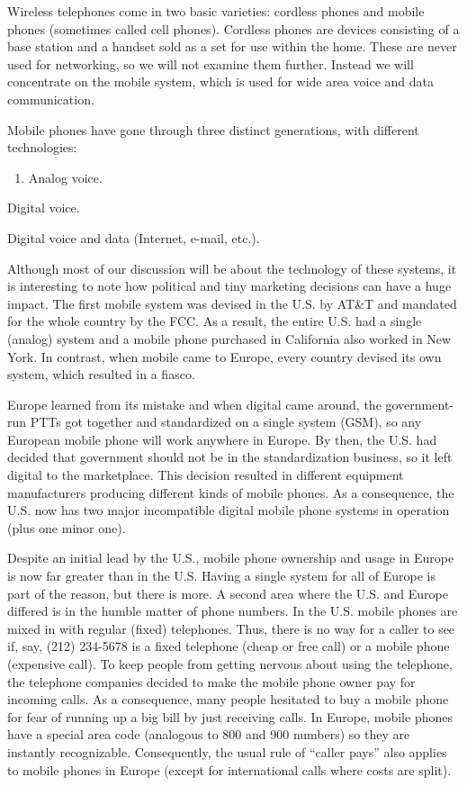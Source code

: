 Wireless telephones come in two basic varieties: cordless phones and
mobile phones (sometimes called {cell phones}). {Cordless phones} are
devices consisting of a base station and a handset sold as a set for use
within the home. These are never used for networking, so we will not
examine them further. Instead we will concentrate on the mobile system,
which is used for wide area voice and data communication.

{Mobile phones} have gone through three distinct generations, with
different technologies:

\begin{enumerate}
\def\labelenumi{\arabic{enumi}.}
\item
  {}

  Analog voice.
\end{enumerate}

Digital voice.

Digital voice and data (Internet, e-mail, etc.).

Although most of our discussion will be about the technology of these
systems, it is interesting to note how political and tiny marketing
decisions can have a huge impact. The first mobile system was devised in
the U.S. by AT\&T and mandated for the whole country by the FCC. As a
result, the entire U.S. had a single (analog) system and a mobile phone
purchased in California also worked in New York. In contrast, when
mobile came to Europe, every country devised its own system, which
resulted in a fiasco.

Europe learned from its mistake and when digital came around, the
government-run PTTs got together and standardized on a single system
(GSM), so any European mobile phone will work anywhere in Europe. By
then, the U.S. had decided that government should not be in the
standardization business, so it left digital to the marketplace. This
decision resulted in different equipment manufacturers producing
different kinds of mobile phones. As a consequence, the U.S. now has two
major incompatible digital mobile phone systems in operation (plus one
minor one).

Despite an initial lead by the U.S., mobile phone ownership and usage in
Europe is now far greater than in the U.S. Having a single system for
all of Europe is part of the reason, but there is more. A second area
where the U.S. and Europe differed is in the humble matter of phone
numbers. In the U.S. mobile phones are mixed in with regular (fixed)
telephones. Thus, there is no way for a caller to see if, say, (212)
234-5678 is a fixed telephone (cheap or free call) or a mobile phone
(expensive call). To keep people from getting nervous about using the
telephone, the telephone companies decided to make the mobile phone
owner pay for incoming calls. As a consequence, many people hesitated to
buy a mobile phone for fear of running up a big bill by just receiving
calls. In Europe, mobile phones have a special area code (analogous to
800 and 900 numbers) so they are instantly recognizable. Consequently,
the usual rule of ``caller pays'' also applies to mobile phones in
Europe (except for international calls where costs are split).

